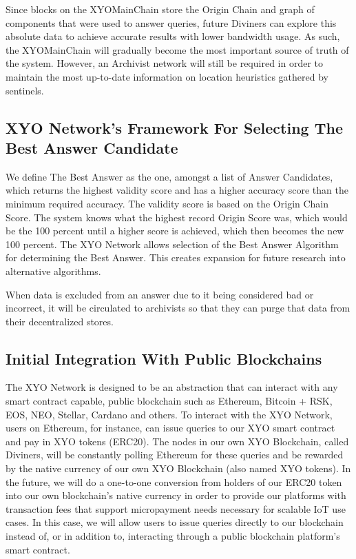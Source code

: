 \documentclass{article}
\begin{document}
Since blocks on the XYOMainChain store the Origin Chain and graph of components that were used to answer queries, future Diviners can explore this absolute data to achieve accurate results with lower bandwidth usage. As such, the XYOMainChain will gradually become the most important source of truth of the system. However, an Archivist network will still be required in order to maintain the most up-to-date information on location heuristics gathered by sentinels.

\subsection{XYO Network’s Framework For Selecting The Best Answer Candidate}

We define The Best Answer as the one, amongst a list of Answer Candidates, which returns the highest validity score and has a higher accuracy score than the minimum required accuracy. The validity score is based on the Origin Chain Score. The system knows what the highest record Origin Score was, which would be the 100 percent until a higher score is achieved, which then becomes the new 100 percent. The XYO Network allows selection of the Best Answer Algorithm for determining the Best Answer. This creates expansion for future research into alternative algorithms.

When data is excluded from an answer due to it being considered bad or incorrect, it will be circulated to archivists so that they can purge that data from their decentralized stores.

\subsection{Initial Integration With Public Blockchains}

The XYO Network is designed to be an abstraction that can interact with any smart contract capable, public blockchain such as Ethereum, Bitcoin + RSK, EOS, NEO, Stellar, Cardano and others. To interact with the XYO Network, users on Ethereum, for instance, can issue queries to our XYO smart contract and pay in XYO tokens (ERC20). The nodes in our own XYO Blockchain, called Diviners, will be constantly polling Ethereum for these queries and be rewarded by the native currency of our own XYO Blockchain (also named XYO tokens). In the future, we will do a one-to-one conversion from holders of our ERC20 token into our own blockchain's native currency in order to provide our platforms with transaction fees that support micropayment needs necessary for scalable IoT use cases. In this case, we will allow users to issue queries directly to our blockchain instead of, or in addition to, interacting through a public blockchain platform's smart contract.
\end{document}
